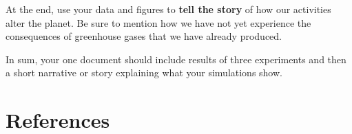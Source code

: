 \documentclass[
  letterpaper,
  DIV=11,
  numbers=noendperiod]{scrreprt}
\begin{document}
At the end, use your data and figures to \textbf{tell the story} of how
our activities alter the planet. Be sure to mention how we have not yet
experience the consequences of greenhouse gases that we have already
produced.

In sum, your one document should include results of three experiments
and then a short narrative or story explaining what your simulations
show.


\chapter*{References}\label{references}

\end{document}
